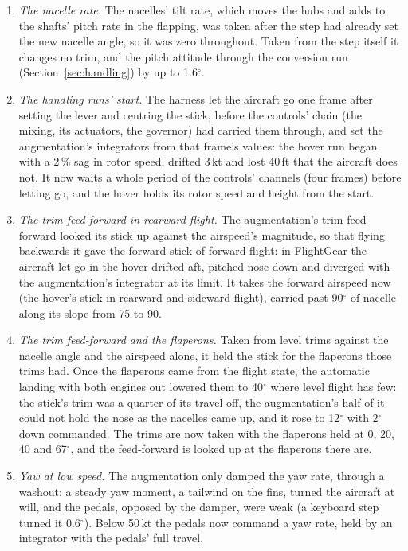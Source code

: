 \documentclass[10pt,a4paper,twocolumn]{article}
\begin{document}
\begin{enumerate}
\item \emph{The nacelle rate.} The nacelles' tilt rate, which moves the hubs and adds to the shafts' pitch rate in the flapping, was taken after
the step had already set the new nacelle angle, so it was zero throughout. Taken from the step itself it changes no trim, and the pitch attitude
through the conversion run (Section~\ref{sec:handling}) by up to 1.6$^\circ$.
\item \emph{The handling runs' start.} The harness let the aircraft go one frame after setting the lever and centring the stick, before the
controls' chain (the mixing, its actuators, the governor) had carried them through, and set the augmentation's integrators from that frame's
values: the hover run began with a 2\,\% sag in rotor speed, drifted 3\,kt and lost 40\,ft that the aircraft does not. It now waits a whole
period of the controls' channels (four frames) before letting go, and the hover holds its rotor speed and height from the start.
\item \emph{The trim feed-forward in rearward flight.} The augmentation's trim feed-forward looked its stick up against the airspeed's
magnitude, so that flying backwards it gave the forward stick of forward flight: in FlightGear the aircraft let go in the hover drifted aft,
pitched nose down and diverged with the augmentation's integrator at its limit. It takes the forward airspeed now (the hover's stick in
rearward and sideward flight), carried past 90$^\circ$ of nacelle along its slope from 75 to 90.
\item \emph{The trim feed-forward and the flaperons.} Taken from level trims against the nacelle angle and the airspeed alone, it held the
stick for the flaperons those trims had. Once the flaperons came from the flight state, the automatic landing with both engines out
lowered them to 40$^\circ$ where level flight has few: the stick's trim was a quarter of its travel off, the augmentation's half of it
could not hold the nose as the nacelles came up, and it rose to 12$^\circ$ with 2$^\circ$ down commanded. The trims are now taken with the
flaperons held at 0, 20, 40 and 67$^\circ$, and the feed-forward is looked up at the flaperons there are.
\item \emph{Yaw at low speed.} The augmentation only damped the yaw rate, through a washout: a steady yaw moment, a tailwind on the fins,
turned the aircraft at will, and the pedals, opposed by the damper, were weak (a keyboard step turned it 0.6$^\circ$). Below 50\,kt the pedals
now command a yaw rate, held by an integrator with the pedals' full travel.

\end{enumerate}
\end{document}
